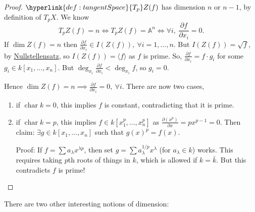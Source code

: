 \documentclass{article}
\newcommand{\A}{\mathbb{A}}
\DeclareMathOperator{\chara}{char}
\begin{document}
\begin{proof}
    $\hyperlink{def:tangentSpace}{T_p} Z(f)$ has dimension $n$ or $n-1$, by definition of $T_p X$.
    We know
    \begin{equation*}
        T_pZ(f) = n \iff T_p Z(f) = \A^n \iff \forall i,\ \frac{\partial f}{\partial x_i} = 0.
    \end{equation*}
    If $\dim Z(f) = n$ then $\frac{\partial f}{\partial x_i} \in I(Z(f)),\ \forall i=1, \dotsc, n$.
    But $I(Z(f)) = \sqrt{f}$, by \hyperlink{def:null2}{Nullstellensatz}, so $I(Z(f))=\langle f \rangle$ as $f$ is prime.
    So, $\frac{\partial f}{\partial x_i} = f \cdot g_i$ for some $g_i \in k[x_1, \dotsc, x_n]$.
    But $\deg_{x_i} \frac{\partial f}{\partial x_i} < \deg_{x_i} f$, so $g_i = 0$.

    Hence $\dim Z(f) = n \implies \frac{\partial f}{\partial x_i} = 0,\ \forall i$.
    There are now two cases,
    \begin{enumerate}[label=(\roman*)]
        \item if $\chara k = 0$, this implies $f$ is constant, contradicting that it is prime.
        \item if $\chara k = p$, this implies $f \in k[x_1^p, \dotsc, x_n^p]$ as $\frac{\partial (x^p)}{\partial x} = p x^{p-1} = 0$.
            Then claim: $\exists g \in k[x_1, \dotsc, x_n]$ such that $g(x)^p = f(x)$.

            Proof: If $f = \sum a_\lambda x^{\lambda p}$, then set $g = \sum a_\lambda^{1/p} x^\lambda$ (for $a_\lambda \in k$) works.
            This requires taking $p$th roots of things in $k$, which is allowed if $k = \bar{k}$.
            But this contradicts $f$ is prime!\qedhere
    \end{enumerate}
\end{proof}
There are two other interesting notions of dimension:
\end{document}

